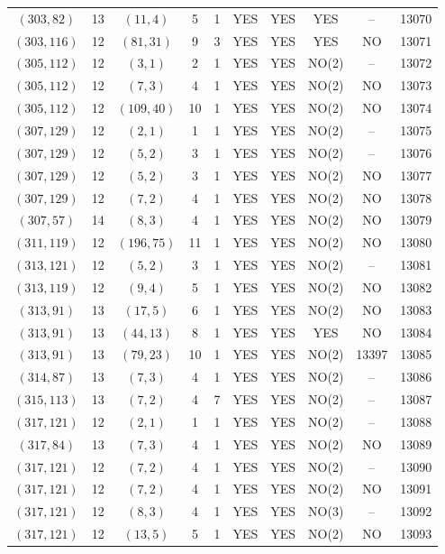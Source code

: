 \begin{longtable}{|c|c|c|c|c|c|c|c|c|c|}
$(303, 82)$ & 13 & $(11, 4)$ & 5 & 1 & YES & YES & YES & -- & 13070\\
$(303, 116)$ & 12 & $(81, 31)$ & 9 & 3 & YES & YES & YES & NO & 13071\\
$(305, 112)$ & 12 & $(3, 1)$ & 2 & 1 & YES & YES & NO(2) & -- & 13072\\
$(305, 112)$ & 12 & $(7, 3)$ & 4 & 1 & YES & YES & NO(2) & NO & 13073\\
$(305, 112)$ & 12 & $(109, 40)$ & 10 & 1 & YES & YES & NO(2) & NO & 13074\\
$(307, 129)$ & 12 & $(2, 1)$ & 1 & 1 & YES & YES & NO(2) & -- & 13075\\
$(307, 129)$ & 12 & $(5, 2)$ & 3 & 1 & YES & YES & NO(2) & -- & 13076\\
$(307, 129)$ & 12 & $(5, 2)$ & 3 & 1 & YES & YES & NO(2) & NO & 13077\\
$(307, 129)$ & 12 & $(7, 2)$ & 4 & 1 & YES & YES & NO(2) & NO & 13078\\
$(307, 57)$ & 14 & $(8, 3)$ & 4 & 1 & YES & YES & NO(2) & NO & 13079\\
$(311, 119)$ & 12 & $(196, 75)$ & 11 & 1 & YES & YES & NO(2) & NO & 13080\\
$(313, 121)$ & 12 & $(5, 2)$ & 3 & 1 & YES & YES & NO(2) & -- & 13081\\
$(313, 119)$ & 12 & $(9, 4)$ & 5 & 1 & YES & YES & NO(2) & NO & 13082\\
$(313, 91)$ & 13 & $(17, 5)$ & 6 & 1 & YES & YES & NO(2) & NO & 13083\\
$(313, 91)$ & 13 & $(44, 13)$ & 8 & 1 & YES & YES & YES & NO & 13084\\
$(313, 91)$ & 13 & $(79, 23)$ & 10 & 1 & YES & YES & NO(2) & 13397 & 13085\\
$(314, 87)$ & 13 & $(7, 3)$ & 4 & 1 & YES & YES & NO(2) & -- & 13086\\
$(315, 113)$ & 13 & $(7, 2)$ & 4 & 7 & YES & YES & NO(2) & -- & 13087\\
$(317, 121)$ & 12 & $(2, 1)$ & 1 & 1 & YES & YES & NO(2) & -- & 13088\\
$(317, 84)$ & 13 & $(7, 3)$ & 4 & 1 & YES & YES & NO(2) & NO & 13089\\
$(317, 121)$ & 12 & $(7, 2)$ & 4 & 1 & YES & YES & NO(2) & -- & 13090\\
$(317, 121)$ & 12 & $(7, 2)$ & 4 & 1 & YES & YES & NO(2) & NO & 13091\\
$(317, 121)$ & 12 & $(8, 3)$ & 4 & 1 & YES & YES & NO(3) & -- & 13092\\
$(317, 121)$ & 12 & $(13, 5)$ & 5 & 1 & YES & YES & NO(2) & NO & 13093\\

\end{longtable}
